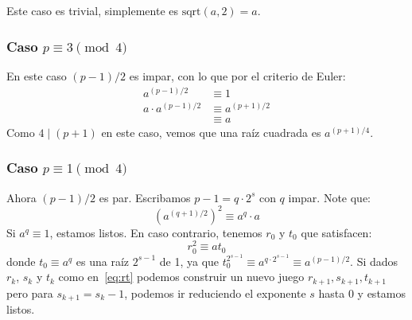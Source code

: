   Este caso es trivial,
  simplemente es \(\mathrm{sqrt}(a, 2) = a\).

\subsubsection{Caso \(p \equiv 3 \pmod{4}\)}
\label{sec:p-equiv-3}

  En este caso \((p - 1) / 2\) es impar,
  con lo que por el criterio de Euler:
  \begin{align*}
    a^{(p - 1) / 2}
      &\equiv 1 \\
    a \cdot a^{(p - 1) / 2}
      &\equiv a^{(p + 1) / 2} \\
      &\equiv a
  \end{align*}
  Como \(4 \mid (p + 1)\) en este caso,
  vemos que una raíz cuadrada es \(a^{(p + 1) / 4}\).

\subsubsection{Caso \(p \equiv 1 \pmod{4}\)}
\label{sec:p-equiv-1}

  Ahora \((p - 1) / 2\) es par.
  Escribamos \(p - 1 = q \cdot 2^s\) con \(q\) impar.
  Note que:
  \begin{equation*}
    \left( a^{(q + 1) / 2} \right)^2
      \equiv a^q \cdot a
  \end{equation*}
  Si \(a^q \equiv 1\),
  estamos listos.
  En caso contrario,
  tenemos \(r_0\) y \(t_0\) que satisfacen:
  \begin{equation}
    \label{eq:rt}
    r_0^2
      \equiv a t_0
  \end{equation}
  donde \(t_0 \equiv a^q\) es una raíz \(2^{s - 1}\) de \num{1},
  ya que \(t_0^{2^{s - 1}} \equiv a^{q \cdot 2^{s - 1}} \equiv a^{(p - 1) / 2}\).
  Si dados \(r_k\), \(s_k\) y \(t_k\) como en~\eqref{eq:rt}
  podemos construir un nuevo juego \(r_{k + 1}, s_{k + 1}, t_{k + 1}\)
  pero para \(s_{k + 1} = s_k - 1\),
  podemos ir reduciendo el exponente \(s\) hasta \num{0} y estamos listos.

